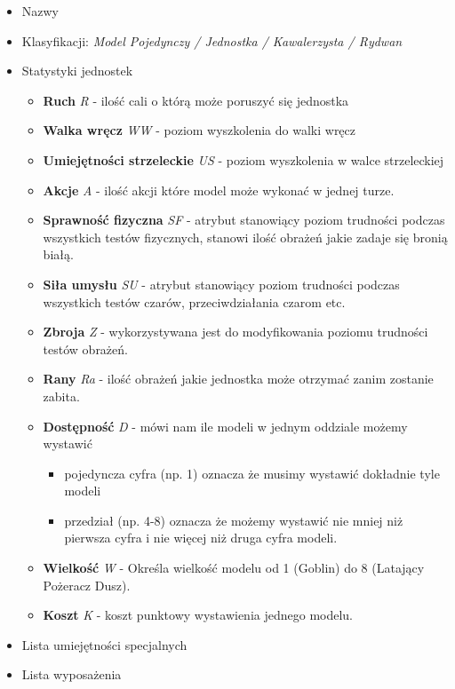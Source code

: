 \begin{itemize}
    \item Nazwy
    \item Klasyfikacji: \textit{Model Pojedynczy / Jednostka / Kawalerzysta / Rydwan}
    \item Statystyki jednostek
    \begin{itemize}
    	\item \textbf{Ruch} \textit{R} - ilość cali o którą może poruszyć się jednostka 
    	\item \textbf{Walka wręcz}  \textit{WW} - poziom wyszkolenia do walki wręcz
    	\item \textbf{Umiejętności strzeleckie}  \textit{US} - poziom wyszkolenia w walce strzeleckiej
    	\item \textbf{Akcje}  \textit{A} - ilość akcji które model może wykonać w jednej turze.
    	\item \textbf{Sprawność fizyczna}  \textit{SF} - atrybut stanowiący poziom trudności podczas wszystkich testów fizycznych, stanowi ilość obrażeń jakie zadaje się bronią białą. 
    	\item \textbf{Siła umysłu}  \textit{SU} - atrybut  stanowiący poziom trudności podczas wszystkich testów czarów, przeciwdziałania czarom etc.
    	\item \textbf{Zbroja}  \textit{Z} - wykorzystywana jest do modyfikowania poziomu trudności testów obrażeń. 
    	\item \textbf{Rany}  \textit{Ra} - ilość obrażeń jakie jednostka może otrzymać zanim zostanie zabita. 
    	\item \textbf{Dostępność}  \textit{D} - mówi nam ile modeli w jednym oddziale możemy wystawić
    	    \begin{itemize}
    	        \item pojedyncza cyfra (np. 1) oznacza że musimy wystawić dokładnie tyle modeli
    	        \item przedział (np. 4-8) oznacza że możemy wystawić nie mniej niż pierwsza cyfra i nie więcej niż druga cyfra modeli. 
    	    \end{itemize}
    	\item \textbf{Wielkość} \textit{W} - Określa wielkość modelu od 1 (Goblin) do 8 (Latający Pożeracz Dusz).
    	\item \textbf{Koszt}  \textit{K} - koszt punktowy wystawienia jednego modelu. 
    \end{itemize} 
    \item Lista umiejętności specjalnych
    \item Lista wyposażenia 
\end{itemize}

